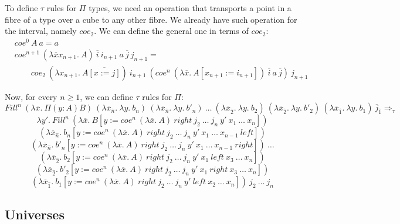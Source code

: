 \documentclass{amsart}
\theoremstyle{definition}
\theoremstyle{remark}
\newcommand{\red}{\Rightarrow}
\numberwithin{figure}{section}
\begin{document}
To define $\tau$ rules for $\Pi$ types, we need an operation that transports a point in a fibre of a type over a cube to any other fibre.
We already have such operation for the interval, namely $coe_2$.
We can define the general one in terms of $coe_2$:
\begin{align*}
& coe^0\ A\ a = a \\
& coe^{n+1}\ (\lambda \overline{x} x_{n+1}.\ A)\ \overline{i}\ i_{n+1}\ a\ \overline{j}\ j_{n+1} = \\
& \qquad coe_2\ (\lambda x_{n+1}.\ A \overline{[x := j]})\ i_{n+1}\ (coe^n\ (\lambda \overline{x}.\ A[x_{n+1} := i_{n+1}])\ \overline{i}\ a\ \overline{j})\ j_{n+1}
\end{align*}

Now, for every $n \geq 1$, we can define $\tau$ rules for $\Pi$:
\[ Fill^n\ (\lambda \overline{x}.\ \Pi (y : A) B)\ (\lambda \overline{x}_{\hat{n}}.\ \lambda y.\ b_n)\ (\lambda \overline{x}_{\hat{n}}.\ \lambda y.\ b'_n)\ \ldots\ (\lambda \overline{x}_{\hat{2}}.\ \lambda y.\ b_2)\ (\lambda \overline{x}_{\hat{2}}.\ \lambda y.\ b'_2)\ (\lambda \overline{x}_{\hat{1}}.\ \lambda y.\ b_1)\ \overline{j}_{\hat{1}} \red_\tau \]
\[ \lambda y'.\ Fill^n\ (\lambda \overline{x}.\ B[y := coe^n\ (\lambda \overline{x}.\ A)\ right\ j_2\ \ldots\ j_n\ y'\ x_1\ \ldots\ x_n]) \]
\[ (\lambda \overline{x}_{\hat{n}}.\ b_n[y := coe^n\ (\lambda \overline{x}.\ A)\ right\ j_2\ \ldots\ j_n\ y'\ x_1\ \ldots\ x_{n-1}\ left]) \]
\[ (\lambda \overline{x}_{\hat{n}}.\ b'_n[y := coe^n\ (\lambda \overline{x}.\ A)\ right\ j_2\ \ldots\ j_n\ y'\ x_1\ \ldots\ x_{n-1}\ right])\ \ldots \]
\[ (\lambda \overline{x}_{\hat{2}}.\ b_2[y := coe^n\ (\lambda \overline{x}.\ A)\ right\ j_2\ \ldots\ j_n\ y'\ x_1\ left\ x_3\ \ldots\ x_n]) \]
\[ (\lambda \overline{x}_{\hat{2}}.\ b'_2[y := coe^n\ (\lambda \overline{x}.\ A)\ right\ j_2\ \ldots\ j_n\ y'\ x_1\ right\ x_3\ \ldots\ x_n]) \]
\[ (\lambda \overline{x}_{\hat{1}}.\ b_1[y := coe^n\ (\lambda \overline{x}.\ A)\ right\ j_2\ \ldots\ j_n\ y'\ left\ x_2\ \ldots\ x_n])\ j_2\ \ldots\ j_n \]

\subsection{Universes}
\end{document}
